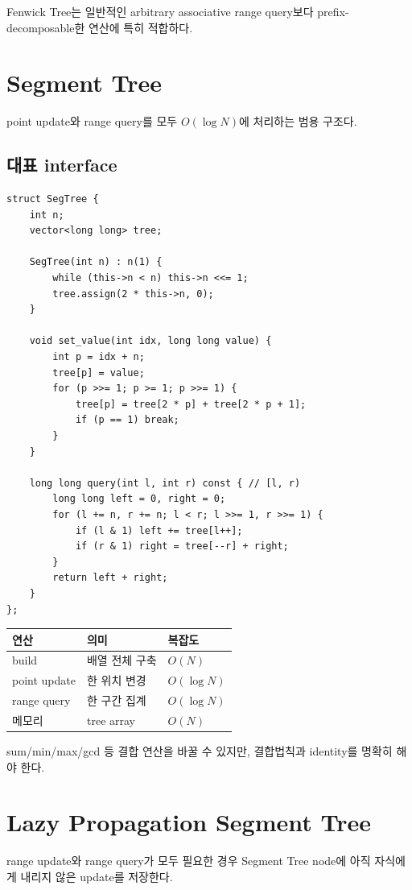 Fenwick Tree는 일반적인 arbitrary associative range query보다 prefix-decomposable한 연산에 특히 적합하다.

\section{Segment Tree}
point update와 range query를 모두 $O(\log N)$에 처리하는 범용 구조다.

\subsection{대표 interface}
\begin{lstlisting}
struct SegTree {
    int n;
    vector<long long> tree;

    SegTree(int n) : n(1) {
        while (this->n < n) this->n <<= 1;
        tree.assign(2 * this->n, 0);
    }

    void set_value(int idx, long long value) {
        int p = idx + n;
        tree[p] = value;
        for (p >>= 1; p >= 1; p >>= 1) {
            tree[p] = tree[2 * p] + tree[2 * p + 1];
            if (p == 1) break;
        }
    }

    long long query(int l, int r) const { // [l, r)
        long long left = 0, right = 0;
        for (l += n, r += n; l < r; l >>= 1, r >>= 1) {
            if (l & 1) left += tree[l++];
            if (r & 1) right = tree[--r] + right;
        }
        return left + right;
    }
};
\end{lstlisting}

\begin{center}
\begin{tabularx}{\textwidth}{p{4cm}p{5cm}X}
\toprule
연산 & 의미 & 복잡도 \\
\midrule
build & 배열 전체 구축 & $O(N)$ \\
point update & 한 위치 변경 & $O(\log N)$ \\
range query & 한 구간 집계 & $O(\log N)$ \\
메모리 & tree array & $O(N)$ \\
\bottomrule
\end{tabularx}
\end{center}

sum/min/max/gcd 등 결합 연산을 바꿀 수 있지만, 결합법칙과 identity를 명확히 해야 한다.

\section{Lazy Propagation Segment Tree}
range update와 range query가 모두 필요한 경우 Segment Tree node에 아직 자식에게 내리지 않은 update를 저장한다.

